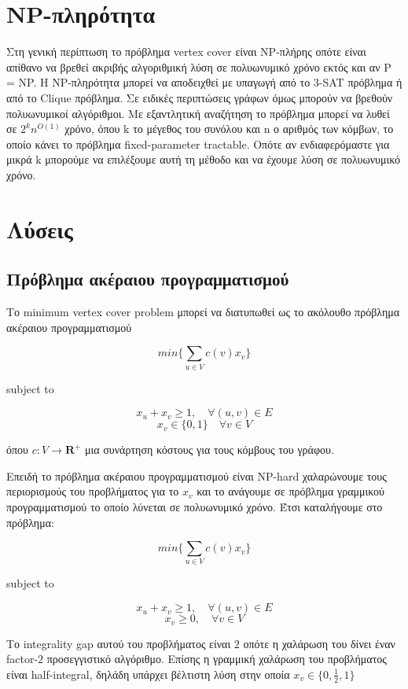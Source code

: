 \section{NP-πληρότητα}

Στη γενική περίπτωση το πρόβλημα vertex cover είναι NP-πλήρης οπότε είναι απίθανο να βρεθεί ακριβής αλγοριθμική λύση σε πολυωνυμικό χρόνο εκτός και αν P = NP. H NP-πληρότητα μπορεί να αποδειχθεί με υπαγωγή από το 3-SAT πρόβλημα ή από το Clique πρόβλημα. Σε ειδικές περιπτώσεις γράφων όμως μπορούν να βρεθούν πολυωνυμικοί αλγόριθμοι. Με εξαντλητική αναζήτηση το πρόβλημα μπορεί να λυθεί σε $2^{k}n^{O(1)}$ χρόνο, όπου k το μέγεθος του συνόλου και n ο αριθμός των κόμβων, το οποίο κάνει το πρόβλημα fixed-parameter tractable. Οπότε αν ενδιαφερόμαστε για μικρά k μπορούμε να επιλέξουμε αυτή τη μέθοδο και να έχουμε λύση σε πολυωνυμικό χρόνο.

\section{Λύσεις}

\subsection{Πρόβλημα ακέραιου προγραμματισμού}

Το minimum vertex cover problem μπορεί να διατυπωθεί ως το ακόλουθο πρόβλημα ακέραιου προγραμματισμού

$$min\{\displaystyle\sum_{u\in{V}} c(v)x_v\}$$ 
\centerline{subject to}
$$x_u + x_v \geq{1}, \quad \forall (u, v) \in{E}$$
$$ x_v \in{\{0, 1\}} \quad \forall v \in{V}$$

όπου $c : V \rightarrow {\boldsymbol{R}^+}$ μια συνάρτηση κόστους για τους κόμβους του γράφου.

Επειδή το πρόβλημα ακέραιου προγραμματισμού είναι NP-hard χαλαρώνουμε τους περιορισμούς του προβλήματος για το $x_v$ και το ανάγουμε σε πρόβλημα γραμμικού προγραμματισμού το οποίο λύνεται σε πολυωνυμικό χρόνο. Έτσι καταλήγουμε στο πρόβλημα:

$$min\{\displaystyle\sum_{u\in{V}} c(v)x_v\}$$ 
\centerline{subject to}
$$x_u + x_v \geq{1}, \quad \forall (u, v) \in{E}$$
$$ x_v \geq 0, \quad \forall v \in{V}$$

Το integrality gap αυτού του προβλήματος είναι $2$ οπότε η χαλάρωση του δίνει έναν factor-$2$ προσεγγιστικό αλγόριθμο. Επίσης η γραμμική χαλάρωση του προβλήματος είναι half-integral, δηλάδη υπάρχει βέλτιστη λύση στην οποία $x_v \in{\{0, \frac{1}{2}, 1\}}$	

